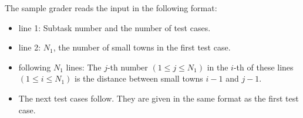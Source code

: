 The sample grader reads the input in the following format:

\begin{itemize}
\item line 1: Subtask number and the number of test cases.
\item line 2: $N_1$, the number of small towns in the first test case.
\item following $N_1$ lines: The $j$-th number $(1\le j \le N_1)$ in the $i$-th of these lines $(1 \le i \le N_1)$ is the distance between small towns $i - 1$ and $j - 1$.
\item The next test cases follow. They are given in the same format as the first test case.
\end{itemize}
